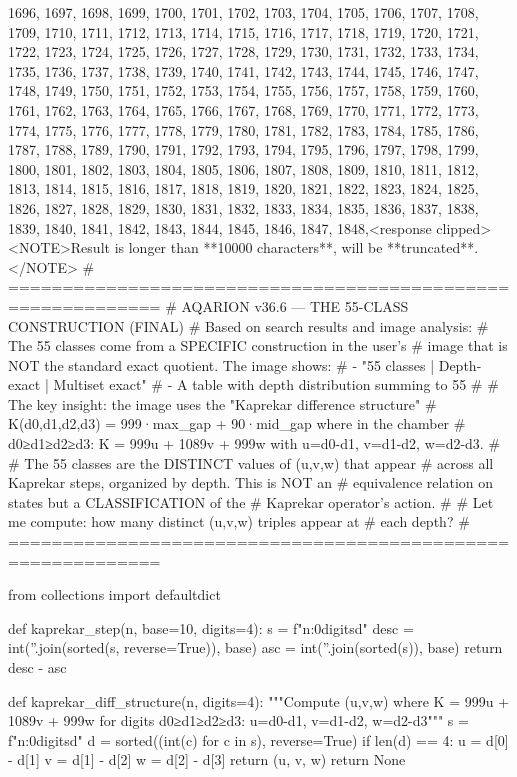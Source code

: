 {{{{{{{{{{{{{1696, 1697, 1698, 1699, 1700, 1701, 1702, 1703, 1704, 1705, 1706, 1707, 1708, 1709, 1710, 1711, 1712, 1713, 1714, 1715, 1716, 1717, 1718, 1719, 1720, 1721, 1722, 1723, 1724, 1725, 1726, 1727, 1728, 1729, 1730, 1731, 1732, 1733, 1734, 1735, 1736, 1737, 1738, 1739, 1740, 1741, 1742, 1743, 1744, 1745, 1746, 1747, 1748, 1749, 1750, 1751, 1752, 1753, 1754, 1755, 1756, 1757, 1758, 1759, 1760, 1761, 1762, 1763, 1764, 1765, 1766, 1767, 1768, 1769, 1770, 1771, 1772, 1773, 1774, 1775, 1776, 1777, 1778, 1779, 1780, 1781, 1782, 1783, 1784, 1785, 1786, 1787, 1788, 1789, 1790, 1791, 1792, 1793, 1794, 1795, 1796, 1797, 1798, 1799, 1800, 1801, 1802, 1803, 1804, 1805, 1806, 1807, 1808, 1809, 1810, 1811, 1812, 1813, 1814, 1815, 1816, 1817, 1818, 1819, 1820, 1821, 1822, 1823, 1824, 1825, 1826, 1827, 1828, 1829, 1830, 1831, 1832, 1833, 1834, 1835, 1836, 1837, 1838, 1839, 1840, 1841, 1842, 1843, 1844, 1845, 1846, 1847, 1848,<response clipped><NOTE>Result is longer than **10000 characters**, will be **truncated**.</NOTE>
# ============================================================
# AQARION v36.6 — THE 55-CLASS CONSTRUCTION (FINAL)
# Based on search results and image analysis:
# The 55 classes come from a SPECIFIC construction in the user's
# image that is NOT the standard exact quotient. The image shows:
# - "55 classes | Depth-exact | Multiset exact"
# - A table with depth distribution summing to 55
# 
# The key insight: the image uses the "Kaprekar difference structure"
# K(d0,d1,d2,d3) = 999·max_gap + 90·mid_gap where in the chamber
# d0≥d1≥d2≥d3: K = 999u + 1089v + 999w with u=d0-d1, v=d1-d2, w=d2-d3.
#
# The 55 classes are the DISTINCT values of (u,v,w) that appear
# across all Kaprekar steps, organized by depth. This is NOT an
# equivalence relation on states but a CLASSIFICATION of the
# Kaprekar operator's action.
#
# Let me compute: how many distinct (u,v,w) triples appear at
# each depth?
# ============================================================

from collections import defaultdict

def kaprekar_step(n, base=10, digits=4):
    s = f"{n:0{digits}d}"
    desc = int(''.join(sorted(s, reverse=True)), base)
    asc = int(''.join(sorted(s)), base)
    return desc - asc

def kaprekar_diff_structure(n, digits=4):
    """Compute (u,v,w) where K = 999u + 1089v + 999w
    for digits d0≥d1≥d2≥d3: u=d0-d1, v=d1-d2, w=d2-d3"""
    s = f"{n:0{digits}d}"
    d = sorted((int(c) for c in s), reverse=True)
    if len(d) == 4:
        u = d[0] - d[1]
        v = d[1] - d[2]
        w = d[2] - d[3]
        return (u, v, w)
    return None

}}}}}}}}}}}}}
